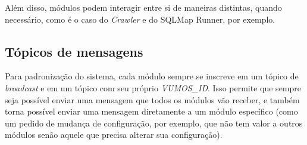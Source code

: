     Além disso, módulos podem interagir entre si de maneiras distintas, quando necessário, como é o caso do \textit{Crawler} e do SQLMap Runner, por exemplo.
    
    \subsection{Tópicos de mensagens}
    
    Para padronização do sistema, cada módulo sempre se inscreve em um tópico de \textit{broadcast} e em um tópico com seu próprio \textit{VUMOS\_ID}. Isso permite que sempre seja possível enviar uma mensagem que todos os módulos vão receber, e também torna possível enviar uma mensagem diretamente a um módulo específico (como um pedido de mudança de configuração, por exemplo, que não tem valor a outros módulos senão aquele que precisa alterar sua configuração).
    

    







% 